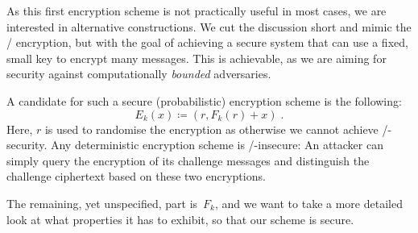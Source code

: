 As this first encryption scheme is not practically useful in most cases, we are interested in alternative constructions.
We cut the discussion short and mimic the \OTP/ encryption, but with the goal of achieving a secure system that can use a fixed, small key to encrypt many messages.
This is achievable, as we are aiming for security against computationally \emph{bounded} adversaries.

A candidate for such a secure (probabilistic) encryption scheme is the following:
\begin{equation}\label{eqn:enc-prp}
        E_k(x) \coloneqq (r, F_k(r) + x)\;.
\end{equation}
Here, $r$ is used to randomise the encryption as otherwise we cannot achieve \CPA/-security.
Any deterministic encryption scheme is \CPA/-insecure:
An attacker can simply query the encryption of its challenge messages and distinguish the challenge ciphertext based on these two encryptions.

The remaining, yet unspecified, part is~$F_k$, and we want to take a more detailed look at what properties it has to exhibit, so that our scheme is secure.

